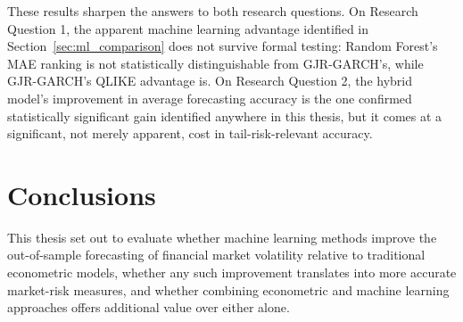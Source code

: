 \documentclass[12pt,a4paper]{article}
\begin{document}
\begin{table}[H]
\centering
{}
\caption{Diebold-Mariano test results (Newey-West HAC variance, Bartlett kernel, 4 lags). $n=874$ for all comparisons.}
\label{tab:dm_results}
\end{table}

These results sharpen the answers to both research questions. On Research Question 1, the apparent
machine learning advantage identified in Section~\ref{sec:ml_comparison} does not survive formal
testing: Random Forest's MAE ranking is not statistically distinguishable from GJR-GARCH's, while
GJR-GARCH's QLIKE advantage is. On Research Question 2, the hybrid model's improvement in average
forecasting accuracy is the one confirmed statistically significant gain identified anywhere in this
thesis, but it comes at a significant, not merely apparent, cost in tail-risk-relevant accuracy.

\section{Conclusions}

This thesis set out to evaluate whether machine learning methods improve the out-of-sample
forecasting of financial market volatility relative to traditional econometric models, whether any
such improvement translates into more accurate market-risk measures, and whether combining
econometric and machine learning approaches offers additional value over either alone.
\end{document}
